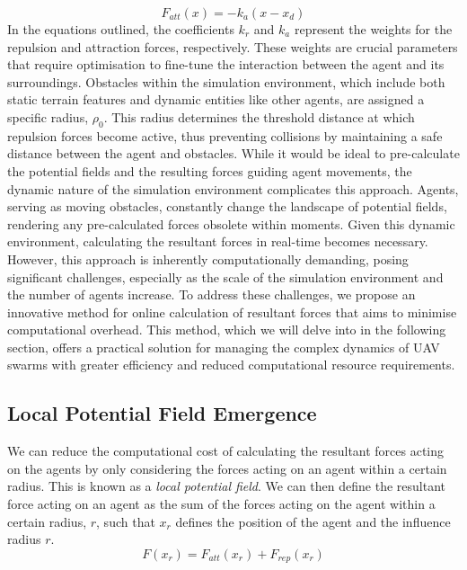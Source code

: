 \documentclass[12pt]{article}
\begin{document}
\begin{equation}
    F_{att}(x) = -k_a(x-x_d)
\end{equation}
In the equations outlined, the coefficients \(k_r\) and \(k_a\) represent the weights for the repulsion and attraction forces, respectively. These weights are crucial parameters that require optimisation to fine-tune the interaction between the agent and its surroundings. Obstacles within the simulation environment, which include both static terrain features and dynamic entities like other agents, are assigned a specific radius, \(\rho_0\). This radius determines the threshold distance at which repulsion forces become active, thus preventing collisions by maintaining a safe distance between the agent and obstacles. While it would be ideal to pre-calculate the potential fields and the resulting forces guiding agent movements, the dynamic nature of the simulation environment complicates this approach. Agents, serving as moving obstacles, constantly change the landscape of potential fields, rendering any pre-calculated forces obsolete within moments. Given this dynamic environment, calculating the resultant forces in real-time becomes necessary. However, this approach is inherently computationally demanding, posing significant challenges, especially as the scale of the simulation environment and the number of agents increase. To address these challenges, we propose an innovative method for online calculation of resultant forces that aims to minimise computational overhead. This method, which we will delve into in the following section, offers a practical solution for managing the complex dynamics of UAV swarms with greater efficiency and reduced computational resource requirements.

\subsection{Local Potential Field Emergence}
\label{sec:lpfe}
We can reduce the computational cost of calculating the resultant forces acting on the agents by only considering the forces acting on an agent within a certain radius. This is known as a \emph{local potential field}. We can then define the resultant force acting on an agent as the sum of the forces acting on the agent within a certain radius, $r$, such that $x_r$ defines the position of the agent and the influence radius $r$.
\begin{equation}
    F(x_r) = F_{att}(x_r) + F_{rep}(x_r)
\end{equation}
\end{document}
